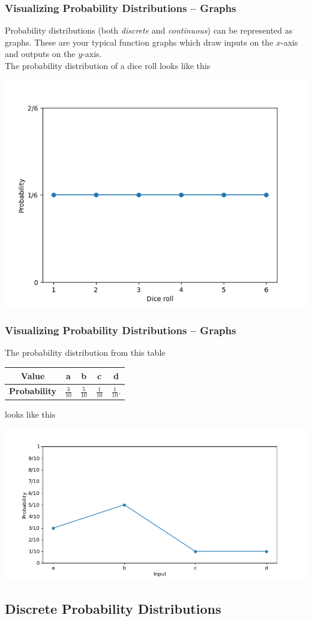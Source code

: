 \documentclass[aspectratio=169,11pt,usenames,dvipsnames]{beamer}
\begin{document}
\begin{frame}
 \frametitle{Visualizing Probability Distributions -- Graphs}
 \alert{Probability distributions} (both \emph{discrete} and \emph{continuous})
 can be represented as graphs. These are your typical function graphs which draw
 inputs on the $x$-axis and outputs on the $y$-axis.\\ \pause
 The probability distribution of a dice roll looks like this
 \vspace*{-1em}
 \begin{center}
  \includegraphics[width=.45\linewidth]{dice-plot.png}
 \end{center}
\end{frame}

\begin{frame}
 \frametitle{Visualizing Probability Distributions -- Graphs}
 The probability distribution from this table
 \begin{center}
  \begin{tabular}{c|cccc}
   \textbf{Value} & a & b & c & d\\
   \midrule
   \textbf{Probability} & $\frac{3}{10}$ & $\frac{5}{10}$ & $\frac{1}{10}$ &
   $\frac{1}{10}$.
  \end{tabular}
 \end{center}
 looks like this
 \vspace*{-1em}
 \begin{center}
  \includegraphics[width=.55\linewidth]{random-probability.png}
 \end{center}
\end{frame}

\subsection{Discrete Probability Distributions}
\end{document}
